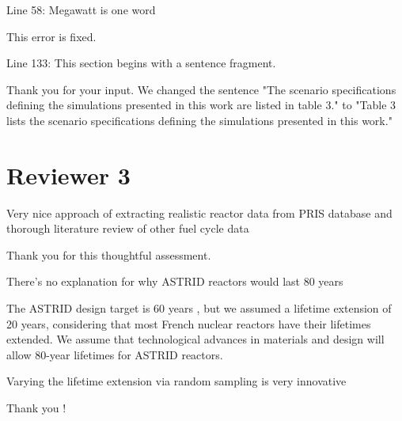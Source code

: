 \documentclass[answers,11pt]{exam}
\begin{document}
\begin{questions}
\begin{solution}
        \end{solution}

        \question Line 58: Megawatt is one word
        \begin{solution}
                This error is fixed.
        \end{solution}

        \question Line 133: This section begins with a sentence fragment.

        \begin{solution}
                Thank you for your input. We changed the sentence
                "The scenario specifications defining the simulations
                presented in this work are listed in table 3."
                to
                "Table 3 lists the scenario specifications defining the
                simulations presented in this work."
        \end{solution}


        \section*{Reviewer 3}
        \question Very nice approach of extracting realistic reactor data from 
        PRIS database and thorough literature review of other fuel cycle data
        \begin{solution}
                Thank you for this thoughtful assessment.
        \end{solution}


        \question There's no explanation for why ASTRID reactors would last 80 
        years

        \begin{solution}
                The ASTRID design target is 60 years \cite{gauche_generation_2012},
                but we assumed a lifetime
                extension of 20 years, considering that most French nuclear reactors
                have their lifetimes extended. We assume that technological
                advances in materials and design will allow 80-year lifetimes
                for ASTRID reactors.
        \end{solution}

        \question Varying the lifetime extension via random sampling is very 
        innovative
        \begin{solution}
                Thank you !
        \end{solution}


\end{questions}
\end{document}
